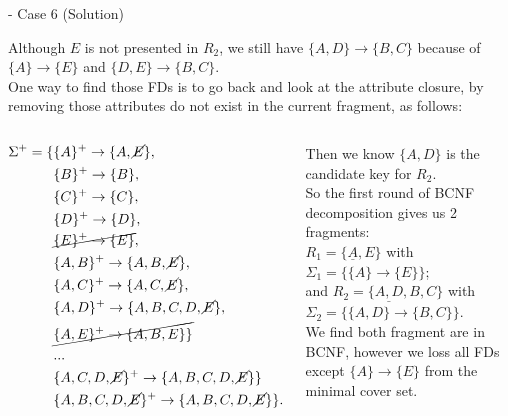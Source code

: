 \begin{frame}[fragile]{ - Case 6 (Solution)}
	
	Although $E$ is not presented in $R_2$, we still have $\{A,D\}\rightarrow\{B,C\}$ because of $\{A\}\rightarrow\{E\}$ and $\{D,E\}\rightarrow\{B,C\}$.\\
	One way to find those FDs is to go back and look at the attribute closure, by removing those attributes do not exist in the current fragment, as follows:
	\vspace{-4pt}
	\begin{columns}
	\begin{scriptsize}\begin{align*} 
			\Sigma^{+} = \{&\{A\}^{+} \rightarrow \{A,\cancel{E}\},\\
			&\{B\}^{+} \rightarrow \{B\},\\
			&\{C\}^{+} \rightarrow \{C\},\\
			&\{D\}^{+} \rightarrow \{D\},\\
			&\cancel{\{E\}^{+} \rightarrow \{E\}},\\
			&\{A,B\}^{+} \rightarrow \{A,B,\cancel{E}\},\\
			&\{A,C\}^{+} \rightarrow \{A,C,\cancel{E}\},\\
			&\{A,D\}^{+} \rightarrow \{A,B,C,D,\cancel{E}\},\\
			&\cancel{\{A,E\}^{+} \rightarrow \{A,B,E\}\}}\\
			& ...\\
			&\{A,C,D,\cancel{E}\}^{+} \rightarrow \{A,B,C,D,\cancel{E}\}\}\\
			&\{A,B,C,D,\cancel{E}\}^{+} \rightarrow \{A,B,C,D,\cancel{E}\}\}.
	\end{align*}\end{scriptsize} 
	Then we know $\{A,D\}$ is the candidate key for $R_2$.\\\vspace{3pt}
	So the first round of BCNF decomposition gives us 2 fragments:\\\vspace{3pt} $R_1=\{\underline{A},E\}$ with $\Sigma_1=\{\{A\}\rightarrow\{E\}\}$;\\ and $R_2=\{\underline{A,D},B,C\}$ with $\Sigma_2=\{\{A,D\}\rightarrow\{B,C\}\}$.\\\vspace{3pt}
	We find both fragment are in BCNF, however we loss all FDs except $\{A\}\rightarrow\{E\}$ from the minimal cover set.\\ \vspace{2pt}
	\end{columns}
	
		
\end{frame}

